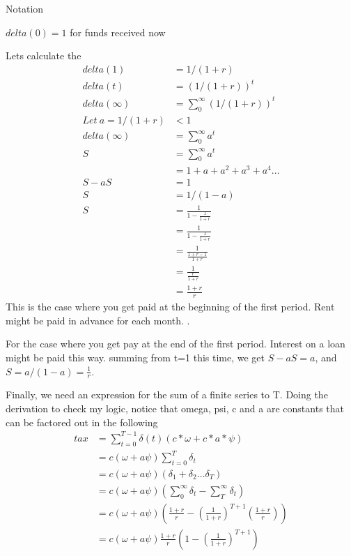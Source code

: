 Notation

$delta(0)=1$  for funds received now

Lets calculate the
\begin{align}
delta (1)   &= 1/(1+r) \\
delta (t)   &= (1/(1+r))^t \\
delta (\infty)   &= \sum_0^\infty\left(1/(1+r)\right)^t\\ 
Let\ a=1/(1+r)&<1\\
delta (\infty)   &= \sum_0^\infty a^t\\ 
S               &= \sum_0^\infty a^t\\ 
               &= 1+a+a^2+a^3+a^4 \dots\\ 
S-aS             &= 1\\ 
S             &= 1/(1-a)\\ 
S             &= \frac{1}{1-\frac{1}{1+r}}\\ 
             &= \frac{1}{1-\frac{1}{1+r}}\\ 
             &= \frac{1}{\frac{1+r-1}{1+r}}\\ 
              &= \frac{1}{\frac{r}{1+r}}\\ 
             &= \frac{1+r}{r}
\end{align}
This is the case where you get paid at the beginning of the first period. Rent might be paid in advance for each month. .

For  the case where you get pay at the end of the first period. Interest on a loan  might be paid this way.  summing from t=1 this time, we get $S-aS =a$, and $S = a/(1-a)= \frac{1}{r}$. 

 


Finally, we need an expression for the sum of a finite  series to T.  Doing the derivation to check my logic, notice that  omega, psi, c  and a are constants that can be factored out in the following
\begin{align}%
    tax&= \sum_{t=0}^{T-1} \delta(t) \left(c*\omega + c*a*\psi \right)\\
        &= c(\omega + a\psi)\sum_{t=0}^T  \delta_t\\
        &= c(\omega + a\psi)(\delta_1+\delta_2 \dots \delta_T)\\
        &= c(\omega + a\psi) \left(\sum_0^\infty \delta_t-\sum_{T}^\infty \delta_t\right)\\
        &= c(\omega + a\psi) \left(\frac{1+r}{r}  - \left(\frac{1}{1+r}\right)^{T+1} \left(\frac{1+r}{r} \right) \right)\\
        &= c(\omega + a\psi) \frac{1+r}{r}\left(1  - \left(\frac{1}{1+r}\right)^{T+1} \right)
\end{align}




